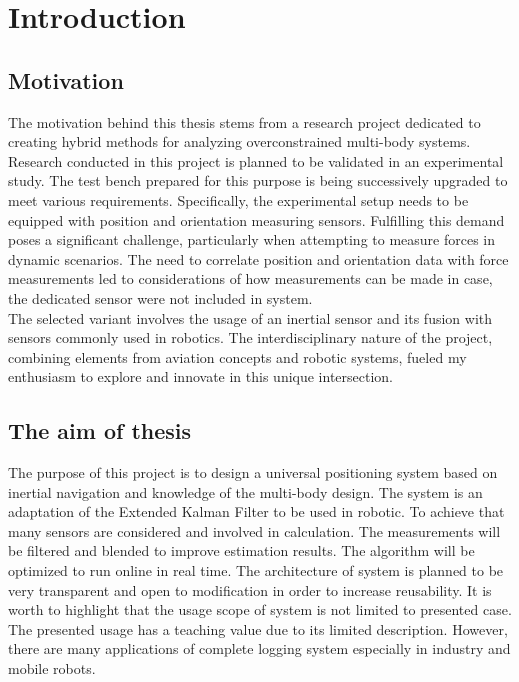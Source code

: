 \chapter{Introduction}

\section{Motivation}

The motivation behind this thesis stems from a research project dedicated to creating hybrid methods for analyzing overconstrained multi-body systems. Research conducted in this project is planned to be validated in an experimental study. The test bench prepared for this purpose is being successively upgraded to meet various requirements. Specifically, the experimental setup needs to be equipped with position and orientation measuring sensors. Fulfilling this demand poses a significant challenge, particularly when attempting to measure forces in dynamic scenarios. The need to correlate position and orientation data with force measurements led to considerations of how measurements can be made in case, the dedicated sensor were not included in system.\\

The selected variant involves the usage of an inertial sensor and its fusion with sensors commonly used in robotics. The interdisciplinary nature of the project, combining elements from aviation concepts and robotic systems, fueled my enthusiasm to explore and innovate in this unique intersection.

\section{The aim of thesis}

The purpose of this project is to design a universal positioning system based on inertial navigation and knowledge of the multi-body design. The system is an adaptation of the Extended Kalman Filter to be used in robotic. To achieve that many sensors are considered and involved in calculation. The measurements will be filtered and blended to improve estimation results. The algorithm will be optimized to run online in real time. The architecture of system is planned to be very transparent and open to modification in order to increase reusability. It is worth to highlight that the usage scope of system is not limited to presented case. The presented usage has a teaching value due to its limited description. However, there are many applications of complete logging system especially in industry and mobile robots.\\

